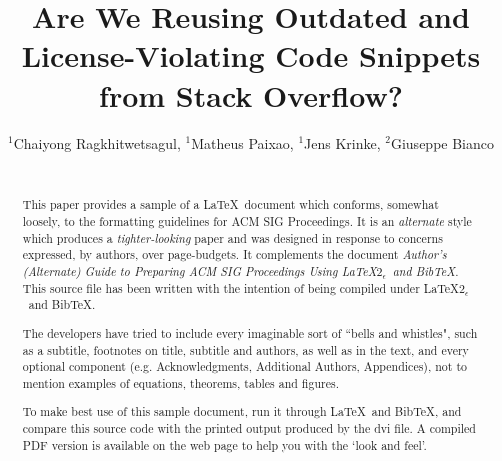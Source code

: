 \documentclass{sig-alternate-05-2015}
\begin{document}






%

\title{Are We Reusing Outdated and License-Violating \newline Code Snippets from Stack Overflow?}

\author{
	\alignauthor
	$^1$Chaiyong Ragkhitwetsagul, $^1$Matheus Paixao, $^1$Jens Krinke, $^2$Giuseppe Bianco \\
	\\
}


\maketitle
\begin{abstract}
This paper provides a sample of a \LaTeX\ document which conforms,
somewhat loosely, to the formatting guidelines for
ACM SIG Proceedings. It is an {\em alternate} style which produces
a {\em tighter-looking} paper and was designed in response to
concerns expressed, by authors, over page-budgets.
It complements the document \textit{Author's (Alternate) Guide to
Preparing ACM SIG Proceedings Using \LaTeX$2_\epsilon$\ and Bib\TeX}.
This source file has been written with the intention of being
compiled under \LaTeX$2_\epsilon$\ and BibTeX.

The developers have tried to include every imaginable sort
of ``bells and whistles", such as a subtitle, footnotes on
title, subtitle and authors, as well as in the text, and
every optional component (e.g. Acknowledgments, Additional
Authors, Appendices), not to mention examples of
equations, theorems, tables and figures.

To make best use of this sample document, run it through \LaTeX\
and BibTeX, and compare this source code with the printed
output produced by the dvi file. A compiled PDF version
is available on the web page to help you with the
`look and feel'.
\end{abstract}
\end{document}
